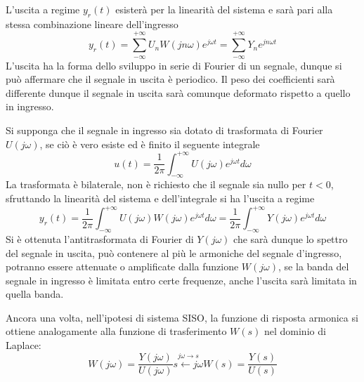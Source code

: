 L'uscita a regime $y_r(t)$ esisterà per la linearità del sistema e sarà pari
alla stessa combinazione lineare dell'ingresso
$$
y_r(t) = \sum_{-\infty}^{+\infty} U_nW(jn\omega)e^{j\omega t} =
\sum_{-\infty}^{+\infty}Y_n e^{j n \omega t}
$$
L'uscita ha la forma dello sviluppo in serie di Fourier di un segnale, dunque
si può affermare che il segnale in uscita è periodico.
Il peso dei coefficienti sarà differente dunque il segnale in uscita sarà
comunque deformato rispetto a quello in ingresso.

Si supponga che il segnale in ingresso sia dotato di trasformata di
Fourier $U(j\omega)$, se ciò è vero esiste ed è finito il seguente integrale
$$
u(t) = \frac{1}{2\pi}\int_{-\infty}^{+\infty} U(j\omega)e^{j\omega t}d\omega
$$
La trasformata è bilaterale, non è richiesto che il segnale sia nullo per
$t<0$, sfruttando la linearità del sistema e dell'integrale si ha l'uscita a
regime
$$
y_r(t) = \frac{1}{2\pi}\int_{-\infty}^{+\infty} U(j\omega) W(j\omega)
e^{j\omega t} d\omega = \frac{1}{2\pi}\int_{-\infty}^{+\infty} Y(j\omega)
e^{j\omega t} d\omega
$$
Si è ottenuta l'antitrasformata di Fourier di $Y(j\omega)$ che sarà dunque lo
spettro del segnale in uscita, può contenere al più le armoniche del segnale
d'ingresso, potranno essere attenuate o amplificate dalla funzione
$W(j\omega)$, se la banda del segnale in ingresso è limitata entro certe
frequenze, anche l'uscita sarà limitata in quella banda.

Ancora una volta, nell'ipotesi di sistema SISO, la funzione di risposta
armonica si ottiene analogamente alla funzione di trasferimento $W(s)$ nel
dominio di Laplace:
$$
W(j\omega) = \frac{Y(j\omega)}{U(j\omega)}
\stackrel{j\omega \rightarrow s}{s\leftarrow j\omega}W(s) =  \frac{Y(s)}{U(s)}
$$
